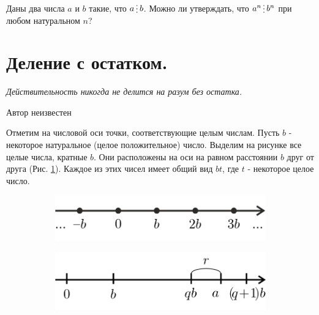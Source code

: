 \begin{thm}\label{4.3}
	Даны два числа $a$ и $b$ такие, что $a\del b$. Можно ли утверждать, что $a^n\del b^n$ при любом натуральном $n$?
\end{thm}


\section{Деление с остатком.}

\epigraph{
\textit{Действительность никогда не делится на разум без остатка.
}}{Автор неизвестен}

Отметим на числовой оси точки, соответствующие целым числам. Пусть $b$ - некоторое натуральное (целое положительное) число. Выделим на рисунке все целые числа, кратные $b$. Они расположены на оси на равном расстоянии $b$ друг от друга (Рис. \ref{axis1}). Каждое из этих чисел имеет общий вид $bt$, где $t$ - некоторое целое число. 

\begin{figure}[h]
\begin{subfigure}{.5\textwidth}
  \centering
\includegraphics[width=.8\linewidth]{./img/axis1}
  \caption{}
  \label{axis1}
\end{subfigure}%
\begin{subfigure}{.5\textwidth}
  \centering
\includegraphics[width=.8\linewidth]{./img/axis2}
  \caption{}
  \label{axis2}
\end{subfigure}
  \caption{}
\end{figure}


